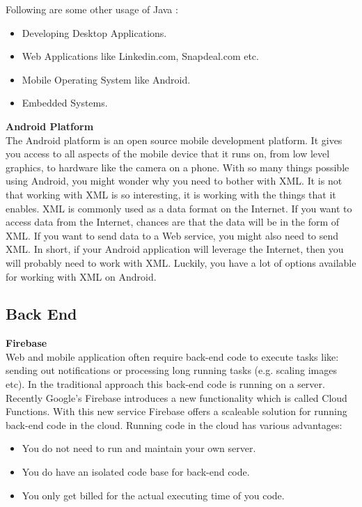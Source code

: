 Following are some other usage of Java :
\begin{itemize}
	\item Developing Desktop Applications.
	\item Web Applications like Linkedin.com, Snapdeal.com etc.
	\item	Mobile Operating System like Android.
	\item	Embedded Systems.
\end{itemize}

\textbf{Android Platform}\\
The Android platform is an open source mobile development platform. It gives you access to all aspects of the mobile device that it runs on, from low level graphics, to hardware like the camera on a phone. With so many things possible using Android, you might wonder why you need to bother with XML. It is not that working with XML is so interesting, it is working with the things that it enables. XML is commonly used as a data format on the Internet. If you want to access data from the Internet, chances are that the data will be in the form of XML. If you want to send data to a Web service, you might also need to send XML. In short, if your Android application will leverage the Internet, then you will probably need to work with XML. Luckily, you have a lot of options available for working with XML on Android.

\subsection{Back End}
\textbf{Firebase}\\
Web and mobile application often require back-end code to execute tasks like: sending out notifications or processing long running tasks (e.g. scaling images etc). In the traditional approach this back-end code is running on a server.\\
Recently Google’s Firebase introduces a new functionality which is called Cloud Functions. With this new service Firebase offers a scaleable solution for running back-end code in the cloud. Running code in the cloud has various advantages:
\begin{itemize}
	\item You do not need to run and maintain your own server.
	\item You do have an isolated code base for back-end code.
	\item You only get billed for the actual executing time of you code.
\end{itemize}
\pagebreak
